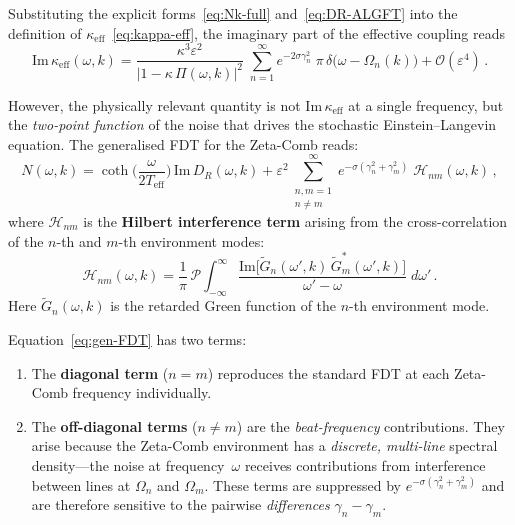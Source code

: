 \documentclass[12pt,a4paper]{article}
\begin{document}
Substituting the explicit forms~\eqref{eq:Nk-full}
and~\eqref{eq:DR-ALGFT} into the definition of
$\kappa_{\mathrm{eff}}$~\eqref{eq:kappa-eff}, the imaginary part of
the effective coupling reads
\begin{equation}\label{eq:Im-kappa-ALGFT}
  \mathrm{Im}\,\kappa_{\mathrm{eff}}(\omega,k)
  = \frac{\kappa^{3}\varepsilon^{2}}
         {\bigl|1-\kappa\,\Pi(\omega,k)\bigr|^{2}}\;
    \sum_{n=1}^{\infty}
    e^{-2\sigma\gamma_{n}^{2}}\;
    \pi\,\delta\bigl(\omega-\Omega_{n}(k)\bigr)
    + \mathcal{O}(\varepsilon^{4})\,.
\end{equation}

However, the physically relevant quantity is not
$\mathrm{Im}\,\kappa_{\mathrm{eff}}$ at a single frequency, but the
\emph{two-point function} of the noise that drives the stochastic
Einstein--Langevin equation.  The generalised FDT for the Zeta-Comb
reads:
\begin{equation}\label{eq:gen-FDT}
  \boxed{
  N(\omega,k)
  = \coth\!\biggl(\frac{\omega}{2T_{\mathrm{eff}}}\biggr)\,
    \mathrm{Im}\,D_{R}(\omega,k)
  + \varepsilon^{2}\!\!\!
    \sum_{\substack{n,m=1\\n\neq m}}^{\infty}
    \!\!\!
    e^{-\sigma(\gamma_{n}^{2}+\gamma_{m}^{2})}\;
    \mathcal{H}_{nm}(\omega,k)\,,}
\end{equation}
where $\mathcal{H}_{nm}$ is the \textbf{Hilbert interference term}
arising from the cross-correlation of the $n$-th and $m$-th
environment modes:
\begin{equation}\label{eq:Hnm}
  \mathcal{H}_{nm}(\omega,k)
  = \frac{1}{\pi}\,\mathcal{P}\!\!\int_{-\infty}^{\infty}
    \frac{\mathrm{Im}\bigl[
      \widetilde{G}_{n}(\omega',k)\,
      \widetilde{G}_{m}^{*}(\omega',k)
    \bigr]}{\omega'-\omega}\;d\omega'\,.
\end{equation}
Here $\widetilde{G}_{n}(\omega,k)$ is the retarded Green function of
the $n$-th environment mode.

\begin{remark}
Equation~\eqref{eq:gen-FDT} has two terms:
\begin{enumerate}
  \item The \textbf{diagonal term} ($n=m$) reproduces the standard FDT
    at each Zeta-Comb frequency individually.
  \item The \textbf{off-diagonal terms} ($n\neq m$) are the
    \emph{beat-frequency} contributions.  They arise because the
    Zeta-Comb environment has a \emph{discrete, multi-line} spectral
    density---the noise at frequency~$\omega$ receives contributions
    from interference between lines at $\Omega_{n}$ and $\Omega_{m}$.
    These terms are suppressed by
    $e^{-\sigma(\gamma_{n}^{2}+\gamma_{m}^{2})}$ and are therefore
    sensitive to the pairwise \emph{differences}
    $\gamma_{n}-\gamma_{m}$.
\end{enumerate}
\end{remark}
\end{document}
